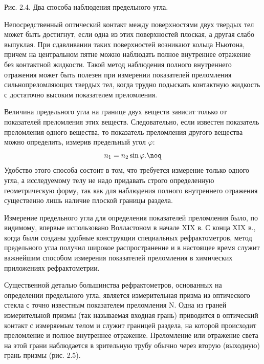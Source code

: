 \leftskip 0cm\centerline{\ris Рис. 2.4. Два способа наблюдения
предельного угла.}

 \vskip 2mm Непосредственный
оптический контакт между поверхностями двух твердых тел может быть
достигнут, если одна из этих поверхностей плоская, а другая слабо
выпуклая. При сдавливании таких поверхностей возникают кольца
Ньютона, причем на центральном пятне можно наблюдать полное
внутреннее отражение без контактной жидкости. Такой метод
наблюдения полного внутреннего отражения может быть полезен при
измерении показателей преломления сильнопреломляющих твердых тел,
когда трудно подыскать контактную жидкость с достаточно высоким
показателем преломления.

Величина предельного угла на границе двух веществ зависит только
от показателей преломления этих веществ. Следовательно, если
известен показатель преломления одного вещества, то показатель
преломления другого вещества можно определить, измерив предельный
угол $\varphi$:
$$n_1=n_2\sin\varphi.\noq$$
Удобство этого способа состоит в том, что требуется измерение
только одного угла, а исследуемому телу не надо придавать строго
определенную геометрическую форму, так как для наблюдения полного
внутреннего отражения существенно лишь наличие плоской границы
раздела.

Измерение предельного угла для определения показателей преломления
было, по видимому, впервые использовано Волластоном в начале XIX
в. С конца XIX в., когда были созданы удобные конструкции
специальных рефрактометров, метод предельного угла получил широкое
распространение и в настоящее время служит важнейшим способом
измерения показателей преломления в химических приложениях
рефрактометрии.

Существенной деталью большинства рефрактометров, основанных на
определении предельного угла, является измерительная призма из
оптического стекла с точно известным показателем преломления N.
Одна из граней измерительной призмы (так называемая входная грань)
приводится в оптический контакт с измеряемым телом и служит
границей раздела, на которой происходит преломление и полное
внутреннее отражение. Преломление или отражение света на этой
грани наблюдается в зрительную трубу обычно через вторую
(выходную) грань призмы (рис. 2.5).

